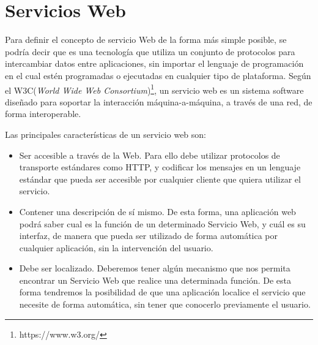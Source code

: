 \section{Servicios Web}
\label{cap:sec:serviciosweb}

Para definir el concepto de servicio Web de la forma más simple posible, se podría decir que es una tecnología que utiliza un conjunto de protocolos para intercambiar datos entre aplicaciones, sin importar el lenguaje de programación en el cual estén programadas o ejecutadas en cualquier tipo de plataforma.\citep{wiki:w3c2004} Según el W3C(\textit{World Wide Web Consortium})\footnote{https://www.w3.org/}, un servicio web es un sistema software diseñado para soportar la interacción máquina-a-máquina, a través de una red, de forma interoperable. 
\newline



Las principales características de un servicio web son:
\citep{TorresJoaquin2017SC}


\begin{itemize}
	\item Ser accesible a través de la Web. Para ello debe utilizar protocolos de transporte estándares como HTTP, y codificar los mensajes en un lenguaje estándar que pueda ser accesible por cualquier cliente que quiera utilizar el servicio. 
	\item Contener una descripción de sí mismo. De esta forma, una aplicación web podrá saber cual es la función de un determinado Servicio Web, y cuál es su interfaz, de manera que pueda ser utilizado de forma automática por cualquier aplicación, sin la intervención del usuario.
	\item Debe ser localizado. Deberemos tener algún mecanismo que nos permita encontrar un Servicio Web que realice una determinada función. De esta forma tendremos la posibilidad de que una aplicación localice el servicio que necesite de forma automática, sin tener que conocerlo previamente el usuario.
\end{itemize}

